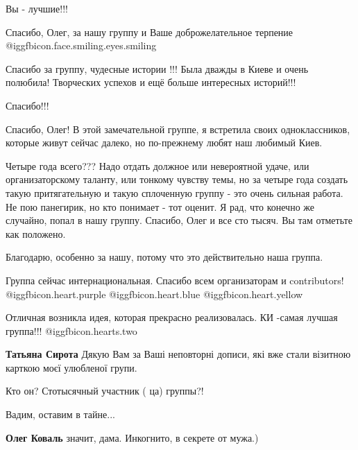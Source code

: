 \begin{itemize}
Вы - лучшие!!!

Спасибо, Олег, за нашу группу и Ваше доброжелательное терпение  @igg{fbicon.face.smiling.eyes.smiling} 

Спасибо за группу, чудесные истории !!! Была дважды в Киеве и очень полюбила!
Творческих успехов и ещё больше интересных историй!!!

Спасибо!!!


Спасибо, Олег! В этой замечательной группе, я встретила своих одноклассников,
которые живут сейчас далеко, но по-прежнему любят наш любимый Киев.


Четыре года всего??? Надо отдать должное или невероятной удаче, или
организаторскому таланту, или тонкому чувству темы, но за четыре года создать
такую притягательную и такую сплоченную группу - это очень сильная работа. Не
пою панегирик, но кто понимает - тот оценит. Я рад, что конечно же случайно,
попал в нашу группу. Спасибо, Олег и все сто тысяч. Вы там отметьте как
положено.

\begin{itemize} %
Благодарю, особенно за нашу, потому что это действительно наша группа.
\end{itemize} %

Группа сейчас интернациональная. Спасибо всем организаторам и contributors!  @igg{fbicon.heart.purple}  @igg{fbicon.heart.blue}  @igg{fbicon.heart.yellow} 


Отличная возникла идея, которая прекрасно реализовалась.
КИ -самая лучшая группа!!! @igg{fbicon.hearts.two} 

\begin{itemize} %
\textbf{Татьяна Сирота} Дякую Вам за Ваші неповторні дописи, які вже стали візитною карткою моєї улюбленої групи.
\end{itemize} %

Кто он? Стотысячный участник ( ца) группы?!

\begin{itemize} %
Вадим, оставим в тайне...

\textbf{Олег Коваль} значит, дама. Инкогнито, в секрете от мужа.)


\end{itemize}
\end{itemize}
